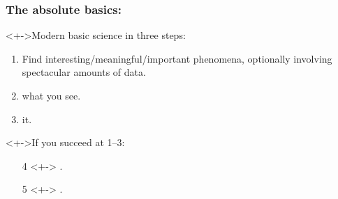 

\begin{frame}

  \frametitle{The absolute basics:}

  \begin{block}<+->{Modern basic science in three steps:}
    \begin{enumerate}
    \item<+->
      Find interesting/meaningful/important phenomena,
      optionally involving spectacular amounts of data.
    \item<+->
       what you see.
    \item<+->
       it.
    \end{enumerate}
  \end{block}

  \begin{block}<+->{If you succeed at 1--3:}
    \begin{enumerate}
    \item[4]<+->
      .
    \item[5]<+->
      .
    \end{enumerate}
  \end{block}

\end{frame}
